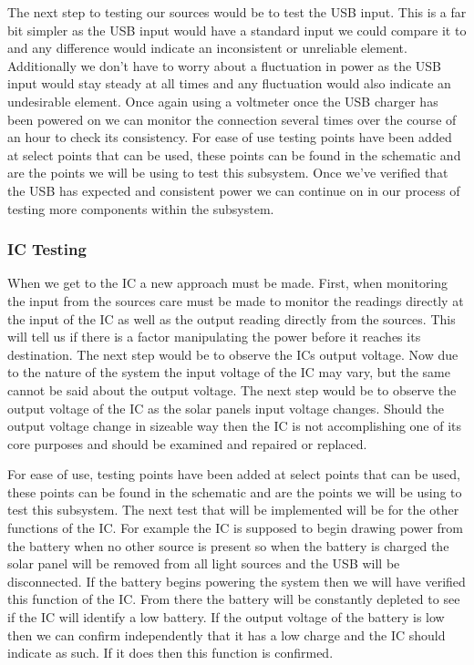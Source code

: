 The next step to testing our sources would be to test the USB input. This is a far bit simpler as the USB input would have a standard input we could compare it to and any difference would indicate an inconsistent or unreliable element. Additionally we don't have to worry about a fluctuation in power as the USB input would stay steady at all times and any fluctuation would also indicate an undesirable element. Once again using a voltmeter once the USB charger has been powered on we can monitor the connection several times over the course of an hour to check its consistency. For ease of use testing points have been added at select points that can be used, these points can be found in the schematic and are the points we will be using to test this subsystem. Once we've verified that the USB has expected and consistent power we can continue on in our process of testing more components within the subsystem.

\subsubsection{IC Testing}
When we get to the IC a new approach must be made. First, when monitoring the input from the sources care must be made to monitor the readings directly at the input of the IC as well as the output reading directly from the sources. This will tell us if there is a factor manipulating the power before it reaches its destination. The next step would be to observe the ICs output voltage. Now due to the nature of the system the input voltage of the IC may vary, but the same cannot be said about the output voltage. The next step would be to observe the output voltage of the IC as the solar panels input voltage changes. Should the output voltage change in sizeable way then the IC is not accomplishing one of its core purposes and should be examined and repaired or replaced. 

For ease of use, testing points have been added at select points that can be used, these points can be found in the schematic and are the points we will be using to test this subsystem. The next test that will be implemented will be for the other functions of the IC. For example the IC is supposed to begin drawing power from the battery when no other source is present so when the battery is charged the solar panel will be removed from all light sources and the USB will be disconnected. If the battery begins powering the system then we will have verified this function of the IC. From there the battery will be constantly depleted to see if the IC will identify a low battery. If the output voltage of the battery is low then we can confirm independently that it has a low charge and the IC should indicate as such. If it does then this function is confirmed.

